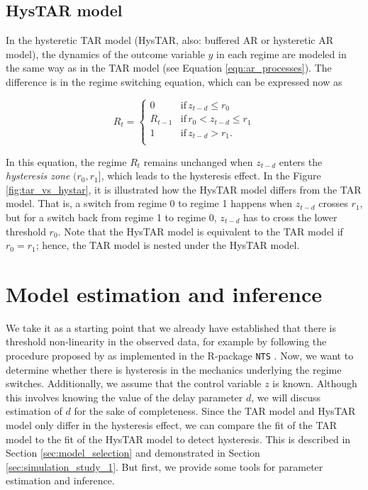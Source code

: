 \documentclass{article}
\begin{document}
\subsection{HysTAR model}
In the hysteretic TAR model (HysTAR, also: buffered AR or hysteretic AR model), the dynamics of the outcome variable $y$ in each regime are modeled in the same way as in the TAR model (see Equation \ref{eqn:ar_processes}). The difference is in the regime switching equation, which can be expressed now as

\begin{equation} \label{eqn:hysteretic_switching}
R_t = \begin{cases}
0 & \mathrm{if} \, z_{t-d} \le r_0 \\
R_{t-1} & \mathrm{if} \, r_0 < z_{t-d} \le r_1 \\
1 & \mathrm{if} \, z_{t-d} > r_1. \\
\end{cases}
\end{equation}

In this equation, the regime $R_t$ remains unchanged when $z_{t-d}$ enters the \textit{hysteresis zone} $(r_0, r_1]$, which leads to the hysteresis effect. In the Figure \ref{fig:tar_vs_hystar}, it is illustrated how the HysTAR model differs from the TAR model.
That is, a switch from regime 0 to regime 1 happens when $z_{t-d}$ crosses $r_1$, but for a switch back from regime 1 to regime 0, $z_{t-d}$ has to cross the lower threshold $r_0$.
Note that the HysTAR model is equivalent to the TAR model if $r_0 = r_1$; hence, the TAR model is nested under the HysTAR model.

\section{Model estimation and inference}
\label{sec:LS_estimation}
We take it as a starting point that we already have established that there is threshold non-linearity in the observed data, for example by following the procedure proposed by \citet{testing_for_threshold_nonlinearity} as implemented in the \textsf{R}-package \texttt{NTS} \citep{R_NTS}. 
Now, we want to determine whether there is hysteresis in the mechanics underlying the regime switches.
Additionally, we assume that the control variable $z$ is known. 
Although this involves knowing the value of the delay parameter $d$, we will discuss estimation of $d$ for the sake of completeness.
Since the TAR model and HysTAR model only differ in the hysteresis effect, we can compare the fit of the TAR model to the fit of the HysTAR model to detect hysteresis.
This is described in Section \ref{sec:model_selection} and demonstrated in Section \ref{sec:simulation_study_1}.
But first, we provide some tools for parameter estimation and inference.
\end{document}

